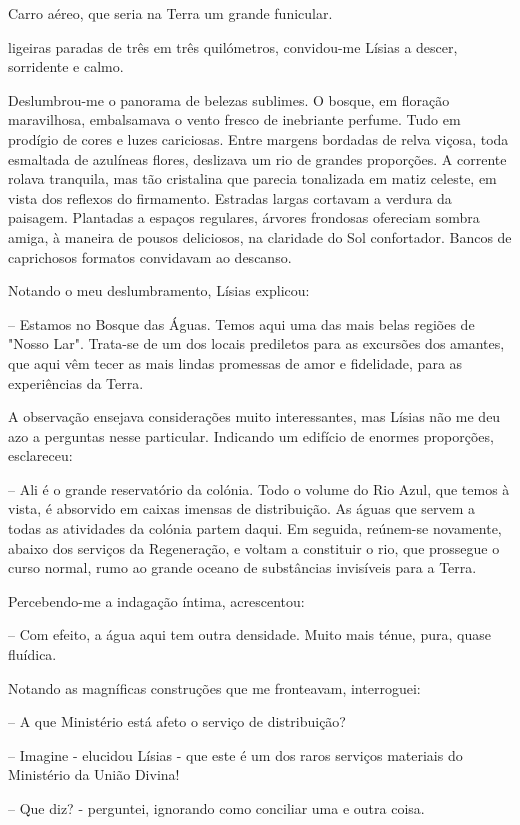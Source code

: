 \documentclass[portuguese,12pt,a4paper]{scrbook}
\begin{document}
	Carro aéreo, que seria na Terra um grande funicular.
	
	
	ligeiras paradas de três em três quilómetros, convidou-me Lísias a descer, sorridente e calmo.
	
	Deslumbrou-me o panorama de belezas sublimes. O bosque, em floração maravilhosa, embalsamava o vento fresco de inebriante perfume. Tudo em prodígio de cores e luzes cariciosas. Entre margens bordadas de relva viçosa, toda esmaltada de azulíneas flores, deslizava um rio de grandes proporções. A corrente rolava tranquila, mas tão cristalina que parecia tonalizada em matiz celeste, em vista dos reflexos do firmamento. Estradas largas cortavam a verdura da paisagem. Plantadas a espaços regulares, árvores frondosas ofereciam sombra amiga, à maneira de pousos deliciosos, na claridade do Sol confortador. Bancos de caprichosos formatos convidavam ao descanso.
	
	Notando o meu deslumbramento, Lísias explicou:
	
	– Estamos no Bosque das Águas. Temos aqui uma das mais belas regiões de "Nosso Lar". Trata-se de um dos locais prediletos para as excursões dos amantes, que aqui vêm tecer as mais lindas promessas de amor e fidelidade, para as experiências da Terra.
	
	A observação ensejava considerações muito interessantes, mas Lísias não me deu azo a perguntas nesse particular. Indicando um edifício de enormes proporções, esclareceu:
	
	– Ali é o grande reservatório da colónia. Todo o volume do Rio Azul, que temos à vista, é absorvido em caixas imensas de distribuição. As águas que servem a todas as atividades da colónia partem daqui. Em seguida, reúnem-se novamente, abaixo dos serviços da Regeneração, e voltam a constituir o rio, que prossegue o curso normal, rumo ao grande oceano de substâncias invisíveis para a Terra.
	
	Percebendo-me a indagação íntima, acrescentou:
	
	– Com efeito, a água aqui tem outra densidade. Muito mais ténue, pura, quase fluídica.
	
	
	Notando as magníficas construções que me fronteavam, interroguei:
	
	– A que Ministério está afeto o serviço de distribuição?
	
	– Imagine - elucidou Lísias - que este é um dos raros serviços materiais do Ministério da União Divina!
	
	– Que diz? - perguntei, ignorando como conciliar uma e outra coisa.
	
\end{document}
